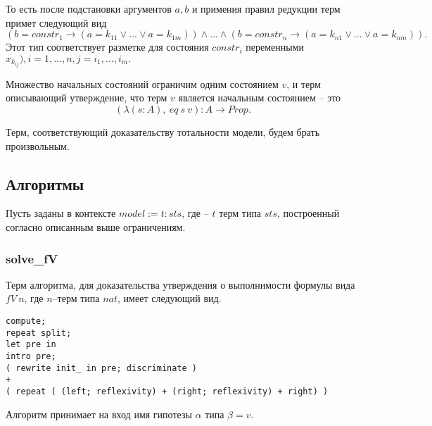\documentclass[12pt]{article}
\begin{document}
То есть после подстановки аргументов $a, b$ и примения правил редукции терм примет следующий вид
$$(b=constr_1 \xrightarrow{} (a=k_{11} \vee ... \vee a=k_{1m})) \wedge ... \wedge (b=constr_n \xrightarrow{} (a=k_{n1} \vee ... \vee a=k_{nm})).$$ 
Этот тип соответствует разметке для состояния $constr_i$ переменными $x_{k_{ij}}), i=1,...,n, j=i_1,...,i_m.$


Множество начальных состояний ограничим одним состоянием $v$, и терм описывающий утверждение, что терм $v$ является начальным состоянием -- это
$$(\lambda (s:A),\ eq\ s\ v): A \xrightarrow{} Prop.$$

Терм, соответствующий доказательству тотальности модели, будем брать произвольным.

\subsection{Алгоритмы}
Пусть заданы в контексте $model:=t:sts$, где -- $t$ терм типа $sts$, построенный согласно описанным выше ограничениям. 
\subsubsection{solve\_fV}
Терм алгоритма, для доказательства утверждения о выполнимости формулы вида $fV \ n$, где $n$--терм типа $nat$, имеет следующий вид.

\begin{verbatim}
compute;
repeat split;
let pre in
intro pre;
( rewrite init_ in pre; discriminate ) 
+
( repeat ( (left; reflexivity) + (right; reflexivity) + right) )
\end{verbatim}
Алгоритм принимает на вход имя гипотезы $\alpha$ типа $\beta = v$.
\end{document}
